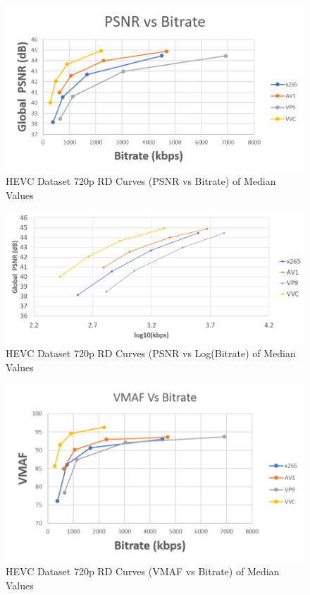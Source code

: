 \documentclass{book}
\begin{document}
\begin{figure}[hbt!]
	\centering
	\includegraphics[width=1.0\linewidth]{pictures/ch7/HEVC-720p_BD-PSNR.png}
	\caption{HEVC Dataset 720p RD Curves (PSNR vs Bitrate) of Median Values}
\label{fig:HEVC-720p-PSNR}
\end{figure}


\begin{figure}[hbt!]
	\centering
	\includegraphics[width=\linewidth]{pictures/ch7/HEVC-720p_logPSNR.png}
	\caption{HEVC Dataset 720p RD Curves (PSNR vs Log(Bitrate) of Median Values}
	\label{fig:HEVC-720p-logPSNR}
\end{figure}

\begin{figure}[hbt!]
	\centering
	\includegraphics[width=1.0\linewidth]{pictures/ch7/HEVC-720p_BD-VMAF.png}
	\caption{HEVC Dataset 720p RD Curves (VMAF vs Bitrate) of Median Values}
\label{fig:HEVC-720p-VMAF}
\end{figure}
\end{document}
